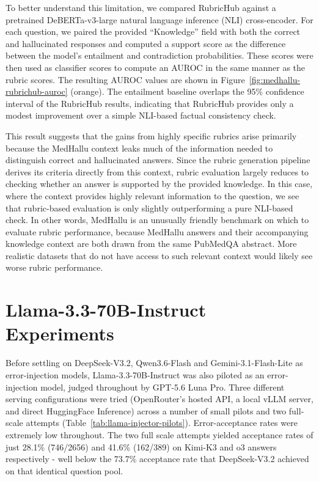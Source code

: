 \documentclass{article}
\newcommand{\appendixsection}[1]{%
  \section{#1}%
  \addcontentsline{apc}{section}{\protect\numberline{\thesection}#1}%
}
\begin{document}
To better understand this limitation, we compared RubricHub against a pretrained DeBERTa-v3-large natural language inference (NLI) cross-encoder. For each question, we paired the provided ``Knowledge'' field with both the correct and hallucinated responses and computed a support score as the difference between the model's entailment and contradiction probabilities. These scores were then used as classifier scores to compute an AUROC in the same manner as the rubric scores. The resulting AUROC values are shown in Figure~\ref{fig:medhallu-rubrichub-auroc} (orange). The entailment baseline overlaps the 95\% confidence interval of the RubricHub results, indicating that RubricHub provides only a modest improvement over a simple NLI-based factual consistency check.

This result suggests that the gains from highly specific rubrics arise primarily because the MedHallu context leaks much of the information needed to distinguish correct and hallucinated answers. Since the rubric generation pipeline derives its criteria directly from this context, rubric evaluation largely reduces to checking whether an answer is supported by the provided knowledge. In this case, where the context provides highly relevant information to the question, we see that rubric-based evaluation is only slightly outperforming a pure NLI-based check. In other words, MedHallu is an unusually friendly benchmark on which to evaluate rubric performance, because MedHallu answers and their accompanying knowledge context are both drawn from the same PubMedQA abstract. More realistic datasets that do not have access to such relevant context would likely see worse rubric performance.

\newpage
\onecolumn
\appendixsection{Llama-3.3-70B-Instruct Experiments}\label{appendix:llama}


Before settling on DeepSeek-V3.2, Qwen3.6-Flash and Gemini-3.1-Flash-Lite as error-injection models, Llama-3.3-70B-Instruct was also piloted as an error-injection model, judged throughout by GPT-5.6 Luna Pro. Three different serving configurations were tried (OpenRouter's hosted API, a local vLLM server, and direct HuggingFace Inference) across a number of small pilots and two full-scale attempts (Table~\ref{tab:llama-injector-pilots}). Error-acceptance rates were extremely low throughout. The two full scale attempts yielded acceptance rates of just 28.1\% (746/2656) and 41.6\% (162/389) on Kimi-K3 and o3 answers respectively - well below the 73.7\% acceptance rate that DeepSeek-V3.2 achieved on that identical question pool.
\end{document}
